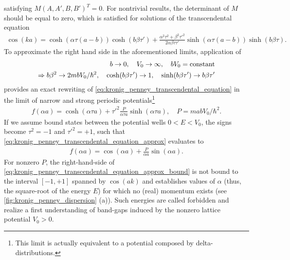 satisfying $M(A,A',B,B')^T=0$.
For nontrivial results, the determinant of $M$ should be equal to zero, which is satisfied for solutions of the transcendental equation
\begin{align}
    \cos(ka)
    =
    \cosh(\alpha\tau(a-b))\cosh(b\beta\tau')
    +
    \frac{\alpha^2\tau^2+\beta^2\tau'^2}{2\alpha\beta\tau\tau'}\sinh(\alpha\tau(a-b))\sinh(b\beta\tau).
    \label{eq:kronig_penney_transcendental_equation}
\end{align}
To approximate the right hand side in the aforementioned limits, application of
\begin{align}
    b\rightarrow0,
    \quad
    V_0\rightarrow\infty,
    \quad
    bV_0 = {\rm constant}
    \\
    \Rightarrow
    b\beta^2\rightarrow 2mbV_0/\hbar^2,
    \quad
    \cosh(b\beta\tau')\rightarrow 1,
    \quad
    \sinh(b\beta\tau')\rightarrow b\beta\tau'
\end{align}
provides an exact rewriting of \cref{eq:kronig_penney_transcendental_equation} in the limit of narrow and strong periodic potentials\footnote{This limit is actually equivalent to a potential composed by delta-distributions.}
\begin{align}
    f(\alpha a) = \cosh(\alpha\tau a) + \tau'^2\frac{P}{\alpha\tau a}\sinh(\alpha\tau a),
    \quad
    P=mabV_0/\hbar^2.
    \label{eq:kronig_penney_transcendental_equation_approx}
\end{align}
If we assume bound states between the potential wells $0<E<V_0$, the signs become $\tau^2=-1$ and $\tau'^2=+1$, such that \cref{eq:kronig_penney_transcendental_equation_approx} evaluates to
\begin{align}
    f(\alpha a) = \cos(\alpha a) + \frac{P}{\alpha a}\sin(\alpha a).
    \label{eq:kronig_penney_transcendental_equation_approx_bound}
\end{align}
For nonzero $P$, the right-hand-side of \cref{eq:kronig_penney_transcendental_equation_approx_bound} is not bound to the interval $[-1,+1]$ spanned by $\cos(ak)$ and establishes values of $\alpha$ (thus, the square-root of the energy $E$) for which no (real) momentum exists (see \cref{fig:kronig_penney_dispersion} (a)).
Such energies are called forbidden and realize a first understanding of band-gaps induced by the nonzero lattice potential $V_0>0$.
